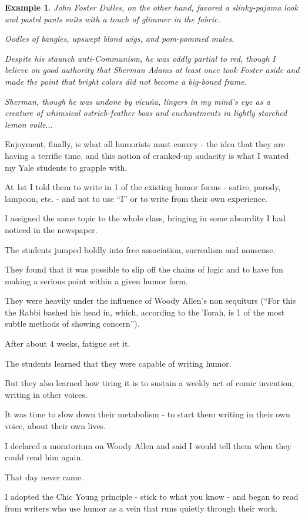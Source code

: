 \documentclass{book}
\numberwithin{equation}{section}
\newtheorem{example}{Example}[chapter]
\begin{document}
\begin{example}
    John Foster Dulles, on the other hand, favored a slinky-pajama look and pastel pants suits with a touch of glimmer in the fabric.
    
    Oodles of bangles, upswept blond wigs, and pom-pommed mules.
    
    Despite his staunch anti-Communism, he was oddly partial to red, though I believe on good authority that Sherman Adams at least once took Foster aside and made the point that bright colors did not become a big-boned frame.
    
    Sherman, though he was undone by vicu\~{n}a, lingers in my mind's eye as a creature of whimsical ostrich-feather boas and enchantments in lightly starched lemon voile$\ldots$    
\end{example}
Enjoyment, finally, is what all humorists must convey - the idea that they are having a terrific time, and this notion of cranked-up audacity is what I wanted my Yale students to grapple with.

At 1st I told them to write in 1 of the existing humor forms - satire, parody, lampoon, etc. - and not to use ``I'' or to write from their own experience.

I assigned the same topic to the whole class, bringing in some absurdity I had noticed in the newspaper.

The students jumped boldly into free association, surrealism and nonsense.

They found that it was possible to slip off the chains of logic and to have fun making a serious point within a given humor form.

They were heavily under the influence of Woody Allen's non sequiturs (``For this the Rabbi bashed his head in, which, according to the Torah, is 1 of the most subtle methods of showing concern'').

After about 4 weeks, fatigue set it.

The students learned that they were capable of writing humor.

But they also learned how tiring it is to sustain a weekly act of comic invention, writing in other voices.

It was time to slow down their metabolism - to start them writing in their own voice, about their own lives.

I declared a moratorium on Woody Allen and said I would tell them when they could read him again.

That day never came.

%
I adopted the Chic Young principle - stick to what you know - and began to read from writers who use humor as a vein that runs quietly through their work.
\end{document}
